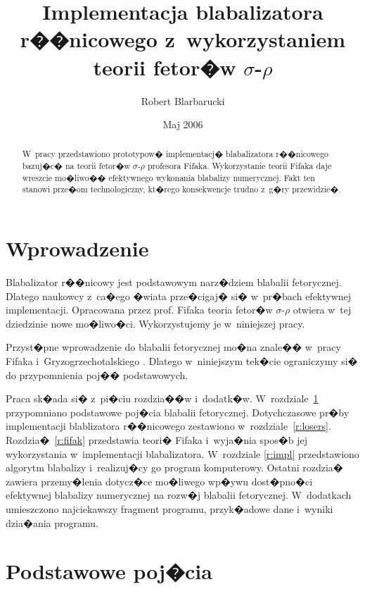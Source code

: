 \documentclass[licencjacka]{pracamgr}
\author{Robert Blarbarucki}
\title{Implementacja blabalizatora r��nicowego z~wykorzystaniem teorii
  fetor�w $\sigma$-$\rho$}
\date{Maj 2006}
\begin{document}
\maketitle

\begin{abstract}
  W~pracy przedstawiono prototypow� implementacj� blabalizatora
  r��nicowego bazuj�c� na teorii fetor�w $\sigma$-$\rho$ profesora
  Fifaka.  Wykorzystanie teorii Fifaka daje wreszcie mo�liwo��
  efektywnego wykonania blabalizy numerycznej.  Fakt ten stanowi
  prze�om technologiczny, kt�rego konsekwencje trudno z~g�ry
  przewidzie�.
\end{abstract}

\tableofcontents

\chapter*{Wprowadzenie}

Blabalizator r��nicowy jest podstawowym narz�dziem blabalii
fetorycznej.  Dlatego naukowcy z~ca�ego �wiata prze�cigaj� si�
w~pr�bach efektywnej implementacji.  Opracowana przez prof. Fifaka
teoria fetor�w $\sigma$-$\rho$ otwiera w~tej dziedzinie nowe
mo�liwo�ci.  Wykorzystujemy je w~niniejszej pracy.

Przyst�pne wprowadzenie do blabalii fetorycznej mo�na znale�� w~pracy
Fifaka i~Gryzogrzechotalskiego \cite{ffgg}.  Dlatego w~niniejszym
tek�cie ograniczymy si� do przypomnienia poj�� podstawowych.

Praca sk�ada si� z~pi�ciu rozdzia��w i~dodatk�w.
W~rozdziale~\ref{r:pojecia} przypomniano podstawowe poj�cia blabalii
fetorycznej.  Dotychczasowe pr�by implementacji blablizatora
r��nicowego zestawiono w~rozdziale~\ref{r:losers}.
Rozdzia�~\ref{r:fifak} przedstawia teori� Fifaka i~wyja�nia spos�b jej
wykorzystania w~implementacji blabalizatora.  W~rozdziale \ref{r:impl}
przedstawiono algorytm blabalizy i~realizuj�cy go program komputerowy.
Ostatni rozdzia� zawiera przemy�lenia dotycz�ce mo�liwego wp�ywu
dost�pno�ci efektywnej blabalizy numerycznej na rozw�j blabalii
fetorycznej.  W~dodatkach umieszczono najciekawszy fragment programu,
przyk�adowe dane i~wyniki dzia�ania programu.

\chapter{Podstawowe poj�cia}\label{r:pojecia}
\end{document}
